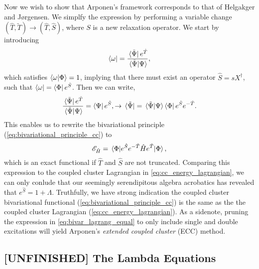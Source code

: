 Now we wish to show that Arponen's framework corresponds to that of Helgakger and 
Jørgensen. We simplfy the expression by performing a variable change 
$(\hat{T}, \tilde{T}) \to (\hat{T}, \hat{S})$, where $S$ is a new relaxation operator.
We start by introducing 
\begin{equation}
    \bra{\omega} = \frac{\bra*{\tilde{\Psi}}e^{\hat{T}}}{\braket*{\tilde{\Psi}}{\Psi}},
\end{equation}
which satisfies $\braket{\omega}{\Phi} = 1$, implying that there must exist an operator
$\hat{S} = sX^\dagger$, such that $\bra{\omega} = \bra{\Phi}e^{\hat{S}}$. Then we 
can write,
\begin{equation}
    \begin{gathered}
        \frac{\bra*{\tilde{\Psi}}e^{\hat{T}}}{\braket*{\tilde{\Psi}}{\Psi}}
        = \bra{\Psi} e^{\hat{S}},
        \to \bra*{\tilde{\Psi}} 
        = \braket*{\tilde{\Psi}}{\Psi}\bra{\Phi}e^{\hat{S}}e^{-\hat{T}}.
    \end{gathered}
\end{equation}
This enables us to rewrite the bivariational principle (\autoref{eq:bivariational_principle_cc})
to 
\begin{equation}
    \label{eq:bivar_lagrang_equal}
    \mathscr{E}_{\hat{H}} = \mel{\Phi}{e^{\hat{S}}e^{-\hat{T}}\hat{H}e^{\hat{T}}}{\Phi},
\end{equation} 
which is an exact functional if $\hat{T}$ and $\hat{S}$ are not truncated. Comparing this 
expression to the coupled cluster Lagrangian in \autoref{eq:cc_energy_lagrangian}, we can only
conlude that our seemingly serendipitous algebra acrobatics has revealed that
$e^{\hat{S}} = 1 + \Lambda$. Truthfully, we have strong indication the coupled cluster bivariational 
functional (\autoref{eq:bivariational_principle_cc}) is the same as the the 
coupled cluster Lagrangian (\autoref{eq:cc_energy_lagrangian}). As a sidenote, pruning 
the expression in \autoref{eq:bivar_lagrang_equal} to only include single and double 
excitations will yield Arponen's \emph{extended coupled cluster} (ECC) method.


\subsection{[UNFINISHED] The Lambda Equations}

